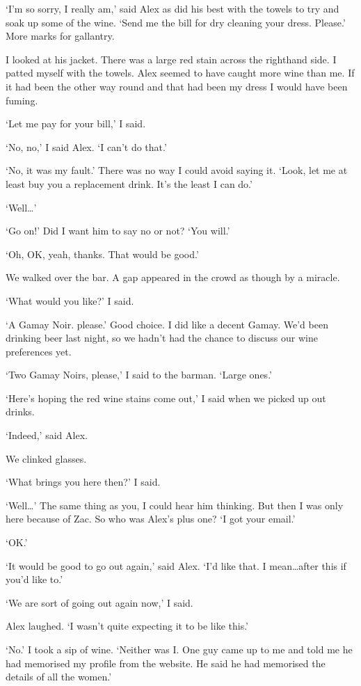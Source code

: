 `I'm so sorry, I really am,' said Alex as did his best with the
towels to try and soak up some of the wine. `Send me the bill for
dry cleaning your dress. Please.' More marks for gallantry.

I looked at his jacket. There was a large red stain across the
righthand side. I patted myself with the towels. Alex seemed to have
caught more wine than me. If it had been the other way round and
that had been my dress I would have been fuming.

`Let me pay for your bill,' I said.

`No, no,' I said Alex. `I can't do that.'

`No, it was my fault.' There was no way I could avoid
saying it. `Look, let me at least buy you a replacement drink. It's the least I can do.'

`Well\dots'

`Go on!' Did I want him to say no or not? `You will.'

`Oh, OK, yeah, thanks. That would be good.'

We walked over the bar. A gap appeared in the crowd as though by a
miracle.

`What would you like?' I said.

`A Gamay Noir. please.' Good choice. I did like a decent Gamay. We'd
been drinking beer last night, so we hadn't had the chance to
discuss our wine preferences yet.

`Two Gamay Noirs, please,' I said to the barman. `Large ones.'

`Here's hoping the red wine stains come out,' I said when we picked
up out drinks.

`Indeed,' said Alex.

We clinked glasses.

`What brings you here then?' I said.

`Well\dots' The same thing as you, I could hear him thinking. But then I was only here because of Zac. So who was Alex's plus one? `I got
your email.'

`OK.'

`It would be good to go out again,' said Alex. `I'd like that. I
mean\dots after this if you'd like to.'

`We are sort of going out again now,' I said.

Alex laughed. `I wasn't quite expecting it to be like this.'

`No.' I took a sip of wine. `Neither was I. One guy came up to me
and told me he had memorised my profile from the website. He said he
had memorised the details of all the women.'

